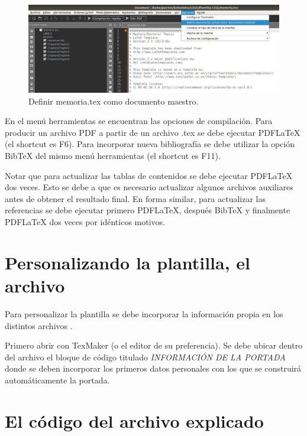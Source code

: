 \begin{figure}[h]
	\centering
	\includegraphics[width=\textwidth]{./Figures/docMaestro.png}
	\caption{Definir memoria.tex como documento maestro.}
	\label{fig:docMaestro}
\end{figure}

En el menú herramientas se encuentran las opciones de compilación.  Para producir un archivo PDF a partir de un archivo .tex se debe ejecutar PDFLaTeX (el shortcut es F6). Para incorporar nueva bibliografía se debe utilizar la opción BibTeX del mismo menú herramientas (el shortcut es F11).

Notar que para actualizar las tablas de contenidos se debe ejecutar PDFLaTeX dos veces.  Esto se debe a que es necesario actualizar algunos archivos auxiliares antes de obtener el resultado final.  En forma similar, para actualizar las referencias se debe ejecutar primero PDFLaTeX, después BibTeX y finalmente PDFLaTeX dos veces por idénticos motivos.

\section{Personalizando la plantilla, el archivo }
\label{sec:FillingFile}

Para personalizar la plantilla se debe incorporar la información propia en los distintos archivos . 

Primero abrir  con TexMaker (o el editor de su preferencia). Se debe ubicar dentro del archivo el bloque de código titulado \emph{INFORMACIÓN DE LA PORTADA} donde se deben incorporar los primeros datos personales con los que se construirá automáticamente la portada.



\section{El código del archivo  explicado}

